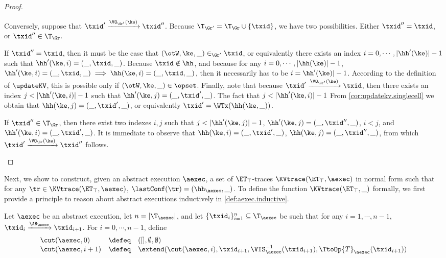 \begin{proof}
\begin{enumerate}
Conversely, suppose that $\txid' \xrightarrow{\VO_{\Gr'}(\ke)} \txid''$. Because 
$\T_{\Gr'} = \T_{\Gr} \cup \{ \txid \}$, we have two possibilities. Either $\txid'' = \txid$, 
or $\txid'' \in \T_{\Gr}$. 

If $\txid'' = \txid$, then it must be the case that $(\otW, \ke, \_) \in_{\Gr'} \txid$, 
or equivalently there exists an index $i=0,\cdots, \lvert \hh'(\ke) \rvert -1 $ such that 
$\hh'(\ke, i) = (\_, \txid, \_)$. Because $\txid \notin \hh$, and because for any 
$i = 0, \cdots, \lvert \hh(\ke) \rvert - 1$, $\hh'(\ke, i) = (\_, \txid, \_) \implies 
\hh(\ke, i) = (\_, \txid, \_)$, then it necessarily has to be $i = \hh'(\ke) \rvert - 1$. 
According to the definition of $\updateKV$, this is possible only if $(\otW,\ke, \_) \in \opset$. 
Finally, note that because $\txid' \xrightarrow{\VO_{\Gr'}(\ke)} \txid$, then 
there exists an index $j < \lvert \hh'(\ke, i) \rvert - 1$ such that 
$\hh'(\ke, j) = (\_, \txid' ,\_)$. The fact that $j < \lvert \hh'(\ke, i) \rvert - 1$ 
From \cref{cor:updatekv.singlecell} we obtain that $\hh(\ke, j) = (\_, \txid', \_)$, 
or equivalently $\txid' = \WTx(\hh(\ke, \_))$. 

If $\txid'' \in \T_{\Gr}$, then there exist two indexes $i,j$ such that 
$j < \lvert \hh'(\ke, j) \rvert - 1$, $\hh'(\ke, j) = (\_, \txid'', \_)$, 
$i < j$, and $\hh'(\ke, i) = (\_, \txid', \_)$. It is immediate to observe 
that $\hh(\ke, i) = (\_, \txid', \_)$, $\hh(\ke, j) = (\_, \txid'', \_)$, 
from which $\txid' \xrightarrow{\VO_{\Gr}(\ke)} \txid''$ follows. 

\end{enumerate}
\end{proof}





Next, we show to construct, given an abstract execution $\aexec$, 
a set of $\ET_{\top}$-traces $\KVtrace(\ET_{\top}, \aexec)$ in normal form such that for any 
$\tr \in \KVtrace(\ET_{\top}, \aexec)$, $\lastConf(\tr) = (\hh_{\aexec}, \_)$. 
To define the function $\KVtrace(\ET_{\top}, \_)$ formally, 
we first provide a principle to reason about abstract executions inductively in \cref{def:aexec.inductive}. 

\begin{definition}
\label{def:aexec.inductive}
Let $\aexec$ be an abstract execution, let $n = \lvert \T_{\aexec} \rvert$, and let 
$\{\txid_{i}\}_{i=1}^{n} \subseteq \T_{\aexec}$ be such that for any $i=1,\cdots,n-1$, 
$\txid_{i} \xrightarrow{\AR_{\aexec}} \txid_{i+1}$. 
For $i = 0,\cdots, n-1$, define 
\[
\begin{array}{lll}
\cut(\aexec, 0) & \defeq & ([], \emptyset, \emptyset)\\
\cut(\aexec , i+1) & \defeq & \extend(\cut(\aexec, i), \txid_{i+1}, \VIS^{-1}_{\aexec}(\txid_{i+1}), \TtoOp{T}_{\aexec}(\txid_{i+1}))
\end{array}
\]
\end{definition}

